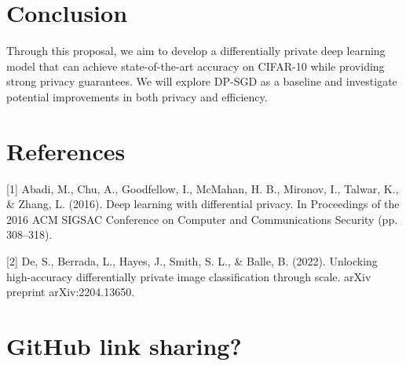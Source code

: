 \documentclass{article}
\begin{document}
\section{Conclusion}
Through this proposal, we aim to develop a differentially private deep learning model that can achieve state-of-the-art accuracy on CIFAR-10 while providing strong privacy guarantees. We will explore DP-SGD as a baseline and investigate potential improvements in both privacy and efficiency.

\section*{References}
\small{
[1] Abadi, M., Chu, A., Goodfellow, I., McMahan, H. B., Mironov, I., Talwar, K., \& Zhang, L. (2016). Deep learning with differential privacy. In Proceedings of the 2016 ACM SIGSAC Conference on Computer and Communications Security (pp. 308–318).

[2] De, S., Berrada, L., Hayes, J., Smith, S. L., \& Balle, B. (2022). Unlocking high-accuracy differentially private image classification through scale. arXiv preprint arXiv:2204.13650.
}

\section*{GitHub link sharing?}
\end{document}
